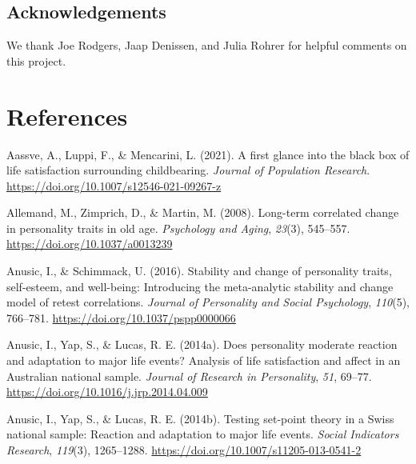 \documentclass[
  english,
  man, noextraspace]{apa7}
\begin{document}
\hypertarget{acknowledgements}{%
\subsection{Acknowledgements}\label{acknowledgements}}

We thank Joe Rodgers, Jaap Denissen, and Julia Rohrer for helpful comments on this project.

\newpage

\hypertarget{references}{%
\section{References}\label{references}}

\begingroup
\setlength{\parindent}{-0.5in}
\setlength{\leftskip}{0.5in}

\hypertarget{refs}{}
\leavevmode\hypertarget{ref-aassveFirstGlanceBlack2021}{}%
Aassve, A., Luppi, F., \& Mencarini, L. (2021). A first glance into the black box of life satisfaction surrounding childbearing. \emph{Journal of Population Research}. \url{https://doi.org/10.1007/s12546-021-09267-z}

\leavevmode\hypertarget{ref-allemandLongtermCorrelatedChange2008a}{}%
Allemand, M., Zimprich, D., \& Martin, M. (2008). Long-term correlated change in personality traits in old age. \emph{Psychology and Aging}, \emph{23}(3), 545--557. \url{https://doi.org/10.1037/a0013239}

\leavevmode\hypertarget{ref-anusicStabilityChangePersonality2016}{}%
Anusic, I., \& Schimmack, U. (2016). Stability and change of personality traits, self-esteem, and well-being: Introducing the meta-analytic stability and change model of retest correlations. \emph{Journal of Personality and Social Psychology}, \emph{110}(5), 766--781. \url{https://doi.org/10.1037/pspp0000066}

\leavevmode\hypertarget{ref-anusicDoesPersonalityModerate2014}{}%
Anusic, I., Yap, S., \& Lucas, R. E. (2014a). Does personality moderate reaction and adaptation to major life events? Analysis of life satisfaction and affect in an Australian national sample. \emph{Journal of Research in Personality}, \emph{51}, 69--77. \url{https://doi.org/10.1016/j.jrp.2014.04.009}

\leavevmode\hypertarget{ref-anusicTestingSetpointTheory2014}{}%
Anusic, I., Yap, S., \& Lucas, R. E. (2014b). Testing set-point theory in a Swiss national sample: Reaction and adaptation to major life events. \emph{Social Indicators Research}, \emph{119}(3), 1265--1288. \url{https://doi.org/10.1007/s11205-013-0541-2}
\end{document}
